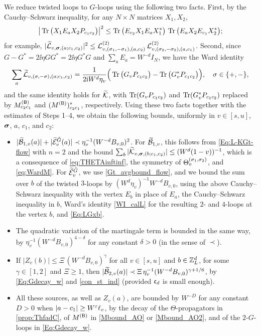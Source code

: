 We reduce twisted loops to $G$-loops using the following two facts. First, by the Cauchy--Schwarz inequality, for any $N\times N$ matrices $X_1,X_2$,
\[ \big|\operatorname{Tr}\big(X_1E_aX_2P_{c_1c_2}\big)\big|^2\le\operatorname{Tr}\big(E_{c_2}X_1E_aX_1^*\big)\,\operatorname{Tr}\big(E_aX_2E_{c_1}X_2^*\big); \]
for example, $|\widetilde{\mathcal L}_{v,{\boldsymbol{\sigma}},(a;c_1,c_2)}|^2\le{\mathcal L}^{(2)}_{v,(\sigma_1,-\sigma_1),(a,c_2)}\,{\mathcal L}^{(2)}_{v,(\sigma_2,-\sigma_2),(a,c_1)}$. Second, since $G-G^*=2\ii\eta GG^*=2\ii\eta G^*G$ and $\sum_aE_a=W^{-d}I_N$, we have the Ward identity
\[ \sum_a\widetilde{\mathcal L}_{v,(\sigma,-\sigma),(a;c_1,c_2)}=\frac{1}{2\mathrm{i} W^d\eta_v}\Big(\operatorname{Tr}\big(G_vP_{c_1c_2}\big)-\operatorname{Tr}\big(G_v^*P_{c_1c_2}\big)\Big),\quad \sigma\in\{+,-\}, \]
and the same identity holds for $\widetilde{\mathcal K}$, with $\operatorname{Tr}(G_vP_{c_1c_2})$ and $\operatorname{Tr}(G_v^*P_{c_1c_2})$ replaced by $M^{({\mathsf{B}})}_{c_2c_1}$ and $(M^{({\mathsf{B}})})^*_{c_2c_1}$, respectively. Using these two facts together with the estimates of Steps 1--4, we obtain the following bounds, uniformly in $v\in[s,u]$, ${\boldsymbol{\sigma}}$, $a$, $c_1$, and $c_2$:
\begin{itemize}
\item $|\widetilde{\mathcal B}_{1,v}(a)|+|\widetilde{\mathcal E}^{{\mathring G}}_v(a)|\prec \eta_v^{-1}(W^{-d}B_{v,0})^2$. For $\widetilde{\mathcal B}_{1,v}$, this follows from \eqref{Eq:L-KGt-flow} with $n=2$ and the bound $\sum_b|\widetilde{\mathcal K}_{v,{\boldsymbol{\sigma}},(b;c_1,c_2)}|\le (W^d(1-v))^{-1}$, which is a consequence of \eqref{eq:THETAinftinf}, the symmetry of $\Theta^{(\sigma_1,\sigma_2)}_v$, and \eqref{eq:WardM}. For $\widetilde{\mathcal E}^{{\mathring G}}_v$, we use \eqref{Gt_avgbound_flow}, and we bound the sum over $b$ of the twisted $3$-loops by $(W^d\eta_v)^{-1}W^{-d}B_{v,0}$, using the above Cauchy--Schwarz inequality with the vertex $E_b$ in place of $E_a$, the Cauchy--Schwarz inequality in $b$, Ward's identity \eqref{WI_calL} for the resulting $2$- and $4$-loops at the vertex $b$, and \eqref{Eq:LGxb}.
\item The quadratic variation of the martingale term is bounded in the same way, by $\eta_v^{-1}(W^{-d}B_{v,0})^{4-\delta}$ for any constant $\delta>0$ (in the sense of $\prec$).
\item If $|Z_{v}(b)|\le \Xi\,(W^{-d}B_{v,0})^{\gamma}$ for all $v\in[s,u]$ and $b\in{\mathbb Z}_L^d$, for some $\gamma\in[1,2]$ and $\Xi\ge 1$, then $|\widetilde{\mathcal B}_{2,v}(a)|\prec \Xi\,\eta_v^{-1}(W^{-d}B_{v,0})^{\gamma+1/6}$, by \eqref{Eq:Gdecay_w} and \eqref{con_st_ind} (provided ${\mathfrak c}_d$ is small enough).
\item All these sources, as well as $Z_v(a)$, are bounded by $W^{-D}$ for any constant $D>0$ when $|a-c_1|\ge W^{{\varepsilon}}\ell_v$, by the decay of the $\Theta$-propagators in \eqref{prop:ThfadC}, of $M^{({\mathsf{B}})}$ in \eqref{Mbound_AO} or \eqref{Mbound_AO2}, and of the $2$-$G$-loops in \eqref{Eq:Gdecay_w}.
\end{itemize}
